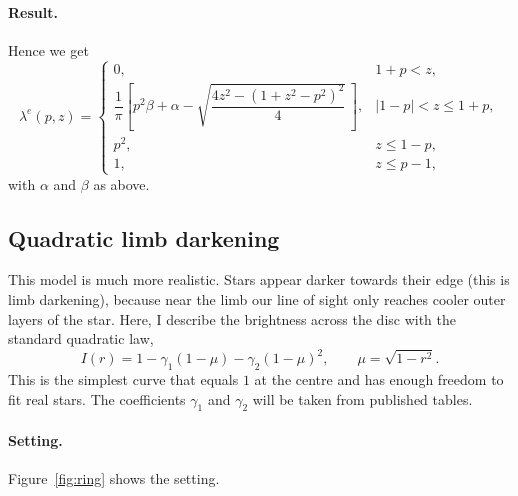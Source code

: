 \documentclass[11pt,a4paper]{article}
\begin{document}
\paragraph{Result.}
Hence we get
\begin{equation}
  \lambda^{e}(p,z) =
  \begin{cases}
    0, & 1 + p < z, \\[4pt]
    \dfrac{1}{\pi}\left[p^2 \beta + \alpha
      - \sqrt{\dfrac{4z^2 - (1 + z^2 - p^2)^2}{4}}\,\right],
      & |1 - p| < z \le 1 + p, \\[12pt]
    p^2, & z \le 1 - p, \\[4pt]
    1, & z \le p - 1,
  \end{cases}
\end{equation}
with $\alpha$ and $\beta$ as above.

\subsection{Quadratic limb darkening}
\label{sec:app-limb}

This model is much more realistic. Stars appear darker towards their edge
(this is limb darkening), because near the limb our line of sight only reaches
cooler outer layers of the star. Here, I describe the brightness across the
disc with the standard quadratic law,
\begin{equation}
  I(r) = 1 - \gamma_1 (1 - \mu) - \gamma_2 (1 - \mu)^2,
  \qquad \mu = \sqrt{1 - r^2}.
\end{equation}
This is the simplest curve that equals $1$ at the centre and has enough
freedom to fit real stars. The coefficients $\gamma_1$ and $\gamma_2$ will be
taken from published tables.

\paragraph{Setting.}
Figure~\ref{fig:ring} shows the setting.
\end{document}
